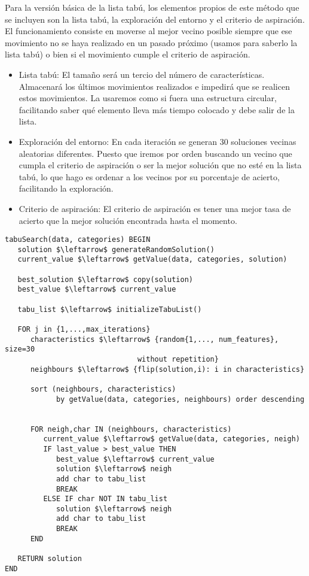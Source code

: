 \documentclass[11pt,leqno]{article}
\begin{document}
	Para la versión básica de la lista tabú, los elementos propios de este método que se incluyen son la lista tabú, la exploración del entorno y el criterio de aspiración. El funcionamiento consiste en moverse al mejor vecino posible siempre que ese movimiento no se haya realizado en un pasado próximo (usamos para saberlo la lista tabú) o bien si el movimiento cumple el criterio de aspiración.
	\begin{itemize}
	\item Lista tabú: El tamaño será un tercio del número de características. Almacenará los últimos movimientos realizados e impedirá que se realicen estos movimientos. La usaremos como si fuera una estructura circular, facilitando saber qué elemento lleva más tiempo colocado y debe salir de la lista.
	\item Exploración del entorno: En cada iteración se generan 30 soluciones vecinas aleatorias diferentes. Puesto que iremos por orden buscando un vecino que cumpla el criterio de aspiración o ser la mejor solución que no esté en la lista tabú, lo que hago es ordenar a los vecinos por su porcentaje de acierto, facilitando la exploración.
	\item Criterio de aspiración: El criterio de aspiración es tener una mejor tasa de acierto que la mejor solución encontrada hasta el momento. 
	\end{itemize}

	\begin{lstlisting}[mathescape=true]
tabuSearch(data, categories) BEGIN
   solution $\leftarrow$ generateRandomSolution()
   current_value $\leftarrow$ getValue(data, categories, solution)
   
   best_solution $\leftarrow$ copy(solution)
   best_value $\leftarrow$ current_value
   
   tabu_list $\leftarrow$ initializeTabuList()
	
   FOR j in {1,...,max_iterations}
      characteristics $\leftarrow$ {random{1,..., num_features}, size=30
                               without repetition}
      neighbours $\leftarrow$ {flip(solution,i): i in characteristics}
      
      sort (neighbours, characteristics) 
            by getValue(data, categories, neighbours) order descending
      
	  
      FOR neigh,char IN (neighbours, characteristics)
         current_value $\leftarrow$ getValue(data, categories, neigh)
         IF last_value > best_value THEN
            best_value $\leftarrow$ current_value
            solution $\leftarrow$ neigh
            add char to tabu_list
            BREAK
         ELSE IF char NOT IN tabu_list
            solution $\leftarrow$ neigh
            add char to tabu_list
            BREAK
      END
      
   RETURN solution
END
	\end{lstlisting}
	
\end{document}
